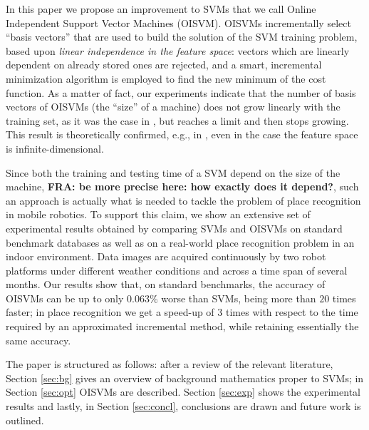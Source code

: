 In this paper we propose an improvement to SVMs that we call Online
Independent Support Vector Machines (OISVM). OISVMs incrementally
select ``basis vectors'' that are used to build the solution of the
SVM training problem, based upon \emph{linear independence in the
feature space}: vectors which are linearly dependent on already stored
ones are rejected, and a smart, incremental minimization algorithm is
employed to find the new minimum of the cost function. As a matter of
fact, our experiments indicate that the number of basis vectors of
OISVMs (the ``size'' of a machine) does not grow linearly with the
training set, as it was the case in \cite{Steinwart03}, but reaches a
limit and then stops growing. This result is theoretically confirmed,
e.g., in \cite{engel2004}, even in the case the feature space is
infinite-dimensional.

Since both the training and testing time of a SVM depend on the size
of the machine, \textbf{FRA: be more precise here: how exactly does it
depend?}, such an approach is actually what is needed to tackle the
problem of place recognition in mobile robotics. To support this
claim, we show an extensive set of experimental results obtained by
comparing SVMs and OISVMs on standard benchmark databases as well as
on a real-world place recognition problem in an indoor
environment. Data images are acquired continuously by two robot
platforms under different weather conditions and across a time span of
several months. Our results show that, on standard benchmarks, the
accuracy of OISVMs can be up to only $0.063\%$ worse than SVMs, being
more than $20$ times faster; in place recognition we get a speed-up of
$3$ times with respect to the time required by an approximated
incremental method, while retaining essentially the same accuracy.

The paper is structured as follows: after a review of the relevant
literature, Section \ref{sec:bg} gives an overview of background
mathematics proper to SVMs; in Section \ref{sec:opt} OISVMs are
described. Section \ref{sec:exp} shows the experimental results and
lastly, in Section \ref{sec:concl}, conclusions are drawn and future
work is outlined.
